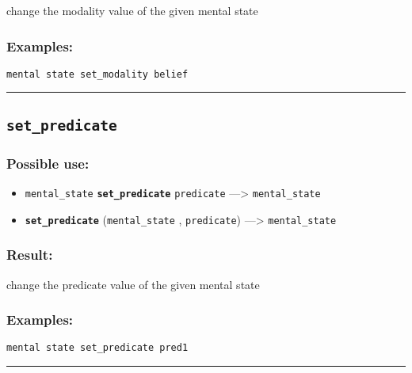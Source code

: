 \documentclass[]{book}
\providecommand{\tightlist}{%
  \setlength{\itemsep}{0pt}\setlength{\parskip}{0pt}}
\theoremstyle{definition}
\theoremstyle{definition}
\theoremstyle{definition}
\theoremstyle{remark}
\begin{document}
change the modality value of the given mental state

\subsubsection{Examples:}\label{examples-320}

\begin{verbatim}
mental state set_modality belief 
\end{verbatim}

\begin{center}\rule{0.5\linewidth}{\linethickness}\end{center}

\subsection{\texorpdfstring{\texttt{set\_predicate}}{set\_predicate}}\label{set_predicate}

\subsubsection{Possible use:}\label{possible-use-464}

\begin{itemize}
\tightlist
\item
  \texttt{mental\_state} \textbf{\texttt{set\_predicate}}
  \texttt{predicate} ---\textgreater{} \texttt{mental\_state}
\item
  \textbf{\texttt{set\_predicate}} (\texttt{mental\_state} ,
  \texttt{predicate}) ---\textgreater{} \texttt{mental\_state}
\end{itemize}

\subsubsection{Result:}\label{result-448}

change the predicate value of the given mental state

\subsubsection{Examples:}\label{examples-321}

\begin{verbatim}
mental state set_predicate pred1 
\end{verbatim}

\begin{center}\rule{0.5\linewidth}{\linethickness}\end{center}
\end{document}
